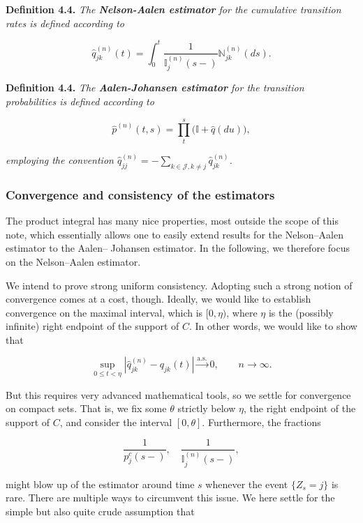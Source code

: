\documentclass[a4paper,10pt,openany]{book}
\begin{document}
\textbf{Definition 4.4.} \emph{The \textbf{Nelson-Aalen estimator} for the cumulative transition rates is defined according to}

\[
\hat q_{jk}^{(n)}(t)=\int_0^t \frac{1}{\mathbb I_{j}^{(n)}(s-)}\mathbb N_{jk}^{(n)}(ds).
\]

\textbf{Definition 4.4.} \emph{The \textbf{Aalen-Johansen estimator} for the transition probabilities is defined according to}

\[
\hat p^{(n)}(t,s)=\prod_t^s\Big(\mathbb I+\hat q(du)\Big),
\]

\emph{employing the convention \(\hat q^{(n)}_{jj}=-\sum_{k\in \mathcal J,k\ne j} \hat q_{jk}^{(n)}\).}

\hypertarget{convergence-and-consistency-of-the-estimators}{%
\subsubsection{Convergence and consistency of the estimators}\label{convergence-and-consistency-of-the-estimators}}

The product integral has many nice properties, most outside the scope of this note, which essentially allows one to easily extend results for the Nelson--Aalen estimator to the Aalen-- Johansen estimator. In the following, we therefore focus on the Nelson--Aalen estimator.

We intend to prove strong uniform consistency. Adopting such a strong notion of convergence comes at a cost, though. Ideally, we would like to establish convergence on the maximal interval, which is \([0,\eta)\), where \(\eta\) is the (possibly infinite) right endpoint of the support of \(C\). In other words, we would like to show that

\[
\sup_{0\le t< \eta}\left\vert \hat q_{jk}^{(n)}-q_{jk}(t)\right\vert\stackrel{\text{a.s.}}{\to}0,\qquad n\to \infty.
\]

But this requires very advanced mathematical tools, so we settle for convergence on compact sets. That is, we fix some \(\theta\) strictly below \(\eta\), the right endpoint of the support of \(C\), and consider the interval \([0, \theta]\). Furthermore, the fractions

\[
\frac{1}{p^c_j(s-)},\quad \frac{1}{\mathbb I^{(n)}_j(s-)},
\]

might blow up of the estimator around time \(s\) whenever the event \(\{Z_s = j\}\) is rare. There are multiple ways to circumvent this issue. We here settle for the simple but also quite crude assumption that
\end{document}
